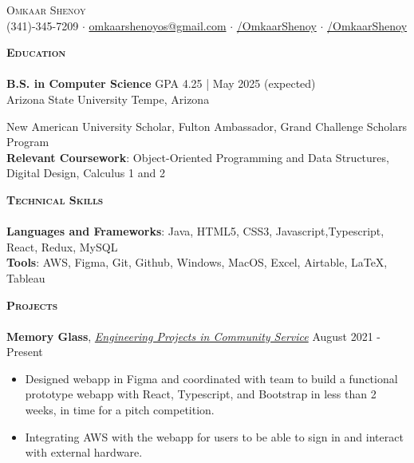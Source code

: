 \documentclass[a4paper]{article}
\newcommand{\lineunder} {
    \vspace*{-8pt} \\
    \hspace*{-18pt} \hrulefill \\
}
\newcommand{\header} [1] {
    {\hspace*{-15pt}\vspace*{3pt} \textsc{#1}}
    \vspace*{-6pt} \lineunder
}
\begin{document}
\vspace*{-30.9pt}



{\begin{center}
	{\Huge \scshape {Omkaar Shenoy}}\\
	\vspace{2mm}
	\faPhone  \hspace{0.5mm} (341)-345-7209 $\cdot$ \href{mailto:omkaarshenoyos@gmail.com}{\faEnvelope \hspace{0.5mm} omkaarshenoyos@gmail.com} \hspace{0.5mm}   $\cdot$ \href{https://www.linkedin.com/in/OmkaarShenoy/}{\faLinkedin/OmkaarShenoy} $\cdot$ \href{https://github.com/OmkaarShenoy}{\faGithub/OmkaarShenoy}
	
\end{center}

\vspace{-3mm}
    \header{\textbf{Education}}

    \textbf{B.S. in Computer Science} \hfill GPA 4.25 | May 2025 (expected)
\\ Arizona State University \hfill Tempe, Arizona
 
New American University Scholar, Fulton Ambassador, Grand Challenge Scholars Program\\
\textbf{Relevant Coursework}: Object-Oriented Programming and Data Structures, Digital Design, Calculus 1 and 2 \\


\vspace{1mm}

\header{\textbf{Technical Skills}}

\textbf{Languages and Frameworks}: Java, HTML5, CSS3, Javascript,Typescript, React, Redux, MySQL \\
\textbf{Tools}: AWS, Figma, Git, Github, Windows, MacOS, Excel, Airtable, \LaTeX, Tableau \\
\vspace{1mm}


\header{\textbf{Projects}}
\textbf{Memory Glass},  \href{https://epics.engineering.asu.edu/}{\textit{Engineering Projects in Community Service}} \faExternalLink
\hfill August 2021 - Present\\
\vspace{-3mm}
\begin{itemize}
    \itemsep-0.05em
    \item Designed webapp in Figma and coordinated with team to build a functional prototype webapp with React, Typescript, and Bootstrap in less than 2 weeks, in time for a pitch competition. 
    \item Integrating AWS with the webapp for users to be able to sign in and interact with external hardware.
    

\end{itemize}}
\end{document}
